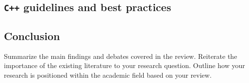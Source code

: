 \subsection{\texttt{C++} guidelines and best practices}

\subsection{Conclusion}
Summarize the main findings and debates covered in the review.
Reiterate the importance of the existing literature to your research question.
Outline how your research is positioned within the academic field based on your review.
